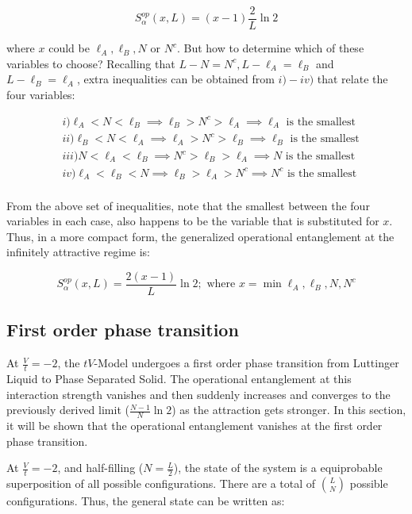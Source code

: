 \begin{equation}
S_\alpha^{op}(x,L) = (x - 1) \frac{2}{L} \ln{2}
\end{equation}

where $x$ could be  $\ell_A, \ell_B, N$ or $N^c$. But how to determine which of these variables to choose? Recalling that $L-N = N^c, L-\ell_A = \ell_B$ and $L-\ell_B = \ell_A$, extra inequalities can be obtained from $i)-iv)$ that relate the four variables:

\begin{align}
& i) \ell_{A} < N < \ell_{B} \implies \ell_{B} > N^c > \ell_{A} \implies \ell_{A} \text{ is the smallest} \\
& ii) \ell_{B} < N < \ell_{A} \implies \ell_{A} > N^c > \ell_{B} \implies \ell_{B} \text{ is the smallest} \\
& iii)  N < \ell_{A} < \ell_{B} \implies N^c > \ell_{B} > \ell_{A} \implies N \text{ is the smallest} \\
& iv) \ell_{A} < \ell_{B} < N \implies \ell_{B} > \ell_{A} > N^c \implies N^c \text{ is the smallest} \\
\end{align}

From the above set of inequalities, note that the smallest between the four variables in each case, also happens to be the variable that is substituted for $x$. Thus, in a more compact form, the generalized operational entanglement at the infinitely attractive regime is:

\begin{equation}
S_\alpha^{op}(x,L) = \frac{2(x-1)}{L} \ln{2} ; \text{ where } x = \min{\ell_A, \ell_B, N, N^c}
\end{equation}

	\subsection{First order phase transition}
	
At $\frac{V}{t} = -2$, the $tV$-Model undergoes a first order phase transition from Luttinger Liquid to Phase Separated Solid. The operational entanglement at this interaction strength vanishes and then suddenly increases and converges to the previously derived limit ($\frac{N-1}{N}\ln{2}$) as the attraction gets stronger. In this section, it will be shown that the operational entanglement vanishes at the first order phase transition.

At $\frac{V}{t}=-2$, and half-filling ($N=\frac{L}{2}$), the state of the system is a equiprobable superposition of all possible configurations. There are a total of ${L}\choose{N}$ possible configurations. Thus, the general state can be written as: 

